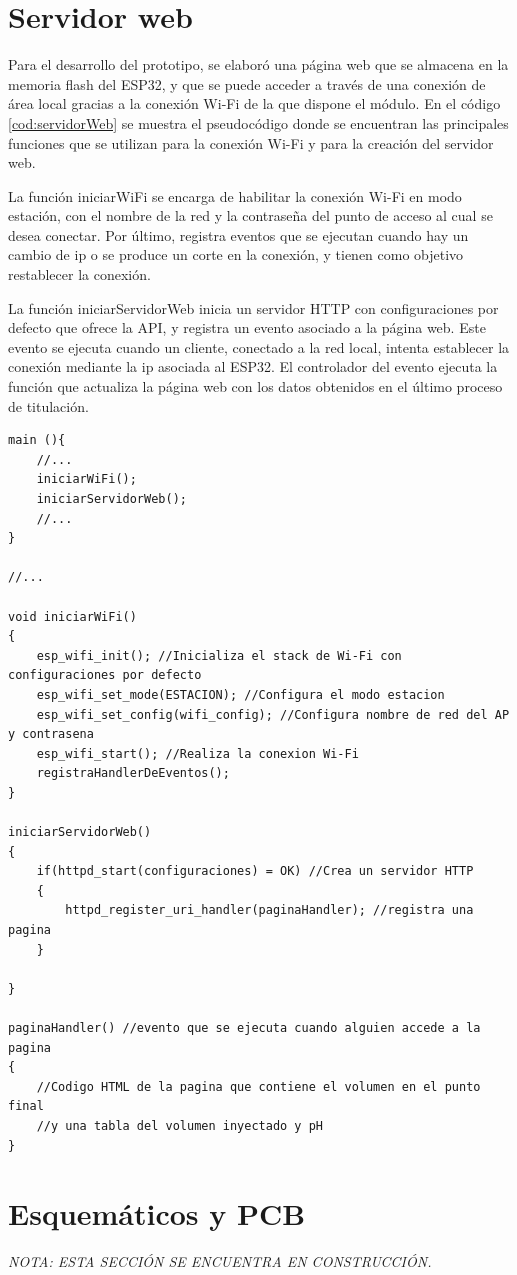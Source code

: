 \section{Servidor web}

Para el desarrollo del prototipo, se elaboró una página web que se almacena en la memoria flash del ESP32, y que se puede acceder a través de una conexión de área local gracias a la conexión Wi-Fi de la que dispone el módulo. En el código \ref{cod:servidorWeb} se muestra el pseudocódigo donde se encuentran las principales funciones que se utilizan para la conexión Wi-Fi y para la creación del servidor web.

La función iniciarWiFi se encarga de habilitar la conexión Wi-Fi en modo estación, con el nombre de la red y la contraseña del punto de acceso al cual se desea conectar. Por último, registra eventos que se ejecutan cuando hay un cambio de ip o se produce un corte en la conexión, y tienen como objetivo restablecer la conexión.

La función iniciarServidorWeb inicia un servidor HTTP con configuraciones por defecto que ofrece la API, y registra un evento asociado a la página web. Este evento se ejecuta cuando un cliente, conectado a la red local, intenta establecer la conexión mediante la ip asociada al ESP32. El controlador del evento ejecuta la función que actualiza la página web con los datos obtenidos en el último proceso de titulación.


\begin{lstlisting}[label=cod:servidorWeb,caption=Pseudocódigo del servidor web.]
main (){
	//...
	iniciarWiFi();
	iniciarServidorWeb();
	//...
}

//...

void iniciarWiFi()
{
	esp_wifi_init(); //Inicializa el stack de Wi-Fi con configuraciones por defecto
	esp_wifi_set_mode(ESTACION); //Configura el modo estacion
	esp_wifi_set_config(wifi_config); //Configura nombre de red del AP y contrasena
	esp_wifi_start(); //Realiza la conexion Wi-Fi
	registraHandlerDeEventos();
}

iniciarServidorWeb()
{
	if(httpd_start(configuraciones) = OK) //Crea un servidor HTTP
	{
		httpd_register_uri_handler(paginaHandler); //registra una pagina
	}
	
}

paginaHandler() //evento que se ejecuta cuando alguien accede a la pagina
{
	//Codigo HTML de la pagina que contiene el volumen en el punto final
	//y una tabla del volumen inyectado y pH
}

\end{lstlisting}


\section{Esquemáticos y PCB}


\textit{ NOTA: ESTA SECCIÓN SE ENCUENTRA EN CONSTRUCCIÓN.}